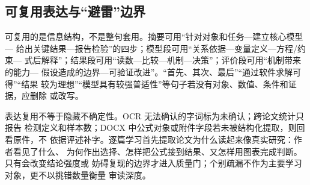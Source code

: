 \subsection{可复用表达与“避雷”边界}

可复用的是信息结构，不是整句套用。摘要可用“针对对象和任务—建立核心模型—
给出关键结果—报告检验”的四步；模型段可用“关系依据—变量定义—方程/约束—
式后解释”；结果段可用“读数—比较—机制—决策”；评价段可用“机制带来的能力—
假设造成的边界—可验证改进”。“首先、其次、最后”“通过软件求解可得”“结果
较为理想”“模型具有较强普适性”等句子若没有对象、数值、条件和证据，应删除
或改写。

表达复用不等于隐藏不确定性。OCR 无法确认的字词标为未确认；跨论文统计只报告
检测定义和样本数；DOCX 中公式对象或附件字段若未被结构化提取，则回看原件，不
依据评述补字。逐篇学习首先提取论文为什么读起来像真实研究：作者看见了什么、
为何作出选择、怎样把公式接到结果、又怎样用图表完成判断。只有会改变结论强度或
妨碍复现的边界才进入质量门；个别疏漏不作为主要学习对象，更不以挑错数量衡量
审读深度。

